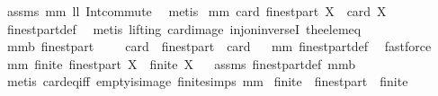 \begin{isabellebody}
%
\isadelimproof
%
\endisadelimproof
%
\isatagproof
{}\isamarkupfalse%
\ assms\ mm{}{}\ ll{}{}\ Int{\isacharunderscore}commute\ \isamarkupfalse%
\ metis%
\endisatagproof
{\isafoldproof}%
%
\isadelimproof
\isanewline
%
\endisadelimproof
{}\isamarkupfalse%
\ mm{}{}{\isacharcolon}\ {\isachardoublequoteopen}card\ {\isacharparenleft}finestpart\ X{\isacharparenright}\ {\isacharequal}\ card\ X{\isachardoublequoteclose}\ \isanewline
%
\isadelimproof
%
\endisadelimproof
%
\isatagproof
{}\isamarkupfalse%
\ finestpart{\isacharunderscore}def\ \isamarkupfalse%
\ {\isacharparenleft}metis\ {\isacharparenleft}lifting{\isacharparenright}\ card{\isacharunderscore}image\ inj{\isacharunderscore}on{\isacharunderscore}inverseI\ the{\isacharunderscore}elem{\isacharunderscore}eq{\isacharparenright}%
\endisatagproof
{\isafoldproof}%
%
\isadelimproof
\isanewline
%
\endisadelimproof
{}\isamarkupfalse%
\ mm{}{}b{\isacharcolon}\ {\isachardoublequoteopen}finestpart\ {\isacharbraceleft}{\isacharbraceright}\ {\isacharequal}\ {\isacharbraceleft}{\isacharbraceright}\ {\isacharampersand}\ card\ {\isasymcirc}\ finestpart\ {\isacharequal}\ card{\isachardoublequoteclose}%
\isadelimproof
\ %
\endisadelimproof
%
\isatagproof
{}\isamarkupfalse%
\ mm{}{}\ finestpart{\isacharunderscore}def\ \isamarkupfalse%
\ fastforce%
\endisatagproof
{\isafoldproof}%
%
\isadelimproof
%
\endisadelimproof
\isanewline
\isanewline
{}\isamarkupfalse%
\ mm{}{}{\isacharcolon}\ {\isachardoublequoteopen}finite\ {\isacharparenleft}finestpart\ X{\isacharparenright}\ {\isacharequal}\ finite\ X{\isachardoublequoteclose}%
\isadelimproof
\ %
\endisadelimproof
%
\isatagproof
{}\isamarkupfalse%
\ assms\ finestpart{\isacharunderscore}def\ mm{}{}b\ \isanewline
{}\isamarkupfalse%
\ {\isacharparenleft}metis\ card{\isacharunderscore}eq{\isacharunderscore}{}{\isacharunderscore}iff\ empty{\isacharunderscore}is{\isacharunderscore}image\ finite{\isachardot}simps\ mm{}{}{\isacharparenright}%
\endisatagproof
{\isafoldproof}%
%
\isadelimproof
%
\endisadelimproof
\isanewline
{}\isamarkupfalse%
\ {\isachardoublequoteopen}finite\ {\isasymcirc}\ finestpart\ {\isacharequal}\ finite{\isachardoublequoteclose}%
\isadelimproof
\ %
\endisadelimproof
%
\isatagproof

\end{isabellebody}
